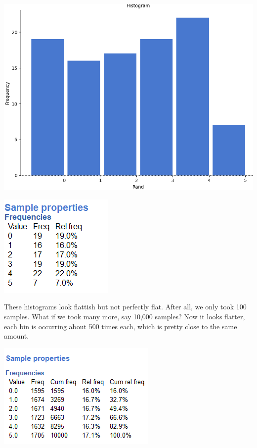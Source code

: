 \documentclass[
]{book}
\begin{document}
\includegraphics{img/ch4/4.3randrawhisto.png}

\includegraphics{img/ch4/4.3randsampleprop.png}

These histograms look flattish but not perfectly flat. After all, we only took 100 samples. What if we took many more, say 10,000 samples? Now it looks flatter, each bin is occurring about 500 times each, which is pretty close to the same amount.

\includegraphics{img/ch4/4.3randsamplepropfor10000.png}
\end{document}

